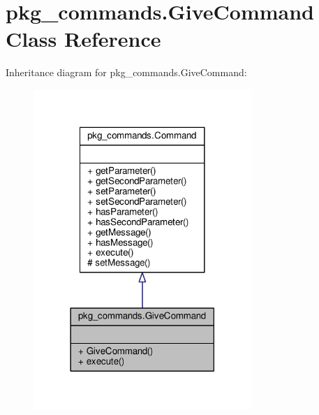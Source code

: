 \hypertarget{classpkg__commands_1_1GiveCommand}{\section{pkg\-\_\-commands.\-Give\-Command Class Reference}
\label{classpkg__commands_1_1GiveCommand}
}


Inheritance diagram for pkg\-\_\-commands.\-Give\-Command\-:
\nopagebreak
\begin{figure}[H]
\begin{center}
\leavevmode
\includegraphics[width=234pt]{classpkg__commands_1_1GiveCommand__inherit__graph}
\end{center}
\end{figure}


